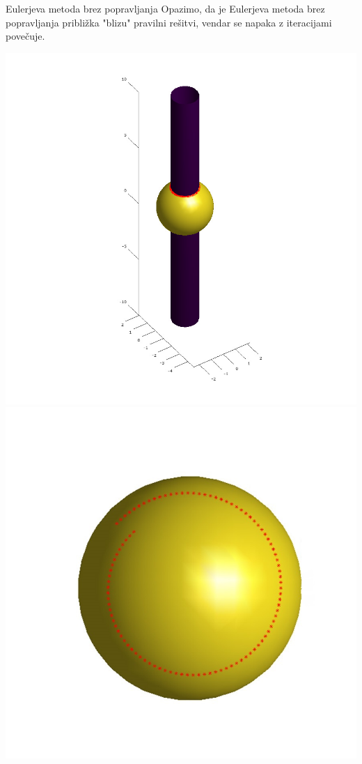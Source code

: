 \documentclass{beamer}
\begin{document}
	\begin{frame}{Eulerjeva metoda brez popravljanja}
		Opazimo, da je Eulerjeva metoda brez popravljanja približka "blizu" pravilni rešitvi, vendar se napaka z iteracijami povečuje. \\
		\begin{center}
			\includegraphics[scale=0.3]{primer2_1}
			\includegraphics[scale=0.30]{eul1}
		\end{center}
	\end{frame}
	
\end{document}
